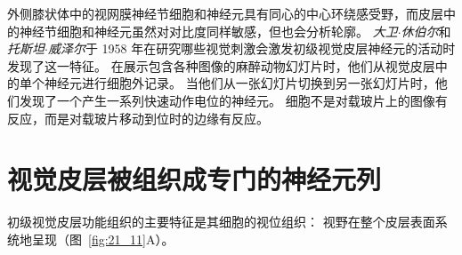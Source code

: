 外侧膝状体中的视网膜神经节细胞和神经元具有同心的中心环绕感受野，而皮层中的神经节细胞和神经元虽然对对比度同样敏感，但也会分析轮廓。
\textit{大卫$\cdot$休伯尔}和\textit{托斯坦$\cdot$威泽尔}于 1958 年在研究哪些视觉刺激会激发初级视觉皮层神经元的活动时发现了这一特征。
在展示包含各种图像的麻醉动物幻灯片时，他们从视觉皮层中的单个神经元进行细胞外记录。
当他们从一张幻灯片切换到另一张幻灯片时，他们发现了一个产生一系列快速动作电位的神经元。
细胞不是对载玻片上的图像有反应，而是对载玻片移动到位时的边缘有反应。



\section{视觉皮层被组织成专门的神经元列}

初级视觉皮层功能组织的主要特征是其细胞的视位组织：
视野在整个皮层表面系统地呈现（图~\ref{fig:21_11}A）。


